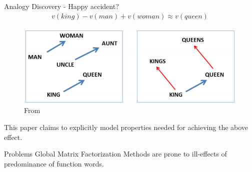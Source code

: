 \begin{frame}{Analogy Discovery - Happy accident?}
  \begin{align*}
    v(king) - v(man) + v(woman) \approx v(queen)
  \end{align*}
    \begin{figure}
      \includegraphics[scale=0.35]{images/mikolov.png}
      \caption{From}
    \end{figure}    
  This paper claims to explicitly model properties needed for achieving the above effect.
\end{frame}

\begin{frame}{Problems}
  Global Matrix Factorization Methods are prone to ill-effects of predominance of function words.
\end{frame}

